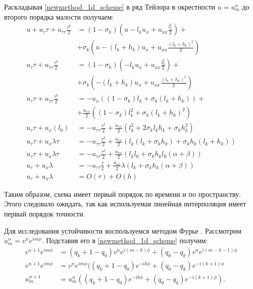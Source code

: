 Раскладывая \eqref{newmethod_1d_scheme} в ряд Тейлора в окрестности $u = u_m^n$ до второго порядка малости получаем:
\begin{align}
u + u_\tau \tau + u_{\tau\tau} \frac{\tau^2}{2} &= (1 - \sigma_k) (u - l_k u_x + u_{xx} \frac{l_k^2}{2}) + \nonumber\\
	&+ \sigma_k (u - (l_k+h_k) u_x + u_{xx} \frac{(l_k+h_k)^2}{2}) \nonumber\\
u_\tau \tau + u_{\tau\tau} \frac{\tau^2}{2} &= (1 - \sigma_k) (- l_k u_x + u_{xx} \frac{l_k^2}{2}) + \nonumber\\
	&+ \sigma_k (- (l_k+h_k) u_x + u_{xx} \frac{(l_k+h_k)^2}{2}) \nonumber\\
u_\tau \tau + u_{\tau\tau} \frac{\tau^2}{2} &= - u_x ( (1 - \sigma_k) l_k + \sigma_k (l_k+h_k) ) + \nonumber\\
	&+\frac{u_{xx}}{2} ( (1 - \sigma_k) l_k^2 + \sigma_k (l_k+h_k)^2 ) \nonumber\\
u_\tau \tau + u_x  ( l_0 ) &= - u_{\tau\tau} \frac{\tau^2}{2} + \frac{u_{xx}}{2} ( l_k^2 + 2 \sigma_k l_k h_k + \sigma_k h_k^2 ) \nonumber\\
u_\tau \tau + u_x  \lambda \tau &= - u_{\tau\tau} \frac{\tau^2}{2} + \frac{u_{xx}}{2} ( l_k (l_k + \sigma_k h_k) + \sigma_k h_k (l_k + h_k) ) \nonumber\\
u_\tau \tau + u_x  \lambda \tau &= - u_{\tau\tau} \frac{\tau^2}{2} + \frac{u_{xx}}{2} ( l_k l_0  + \sigma_k h_k l_0 (\alpha + \beta) ) \nonumber\\
u_\tau + u_x  \lambda &= - u_{\tau\tau} \frac{\tau}{2} + \frac{u_{xx}}{2} \lambda ( l_k  + \sigma_k h_k (\alpha + \beta) ) \nonumber\\
u_\tau + u_x  \lambda &= O(\tau) + O (h)
\end{align}

Таким образом, схема имеет первый порядок по времени и по пространству. Этого следовало ожидать, так как используемая линейная интерполяция имеет первый порядок точности.

Для исследования устойчивости воспользуемся методом Фурье \cite{holodov}. Рассмотрим $u_m^n = v^n e^{im\phi}$. Подставив его в \eqref{newmethod_1d_scheme} получим:
\begin{align}
v^{n+1} e^{im\phi} &= (q_k + 1 - q_0) v^{n} e^{i(m-k)\phi} + (q_0 - q_k) v^{n} e^{i(m-k-1)\phi} \nonumber\\
v^{n+1} e^{im\phi} &= v^{n} e^{im\phi} ((q_k + 1 - q_0) e^{-ik\phi} + (q_0 - q_k) e^{-i(k+1)\phi} \nonumber\\
u_m^{n+1} &= u_m^n ((q_k + 1 - q_0) e^{-ik\phi} + (q_0 - q_k) e^{-i(k+1)\phi}).
\end{align}

